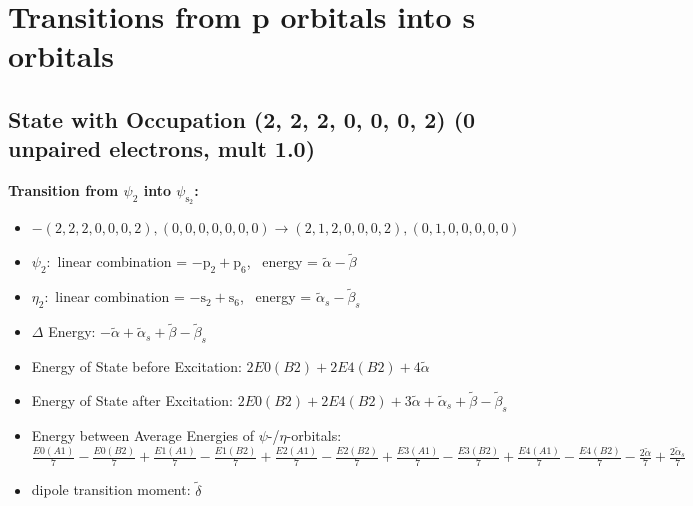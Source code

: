 \documentclass[12pt,a4paper]{article}
\begin{document}
\newpage \section*{Transitions from p orbitals into s orbitals}\subsection*{State with Occupation (2, 2, 2, 0, 0, 0, 2) (0 unpaired electrons, mult 1.0)}
        \noindent\textbf{Transition from $\psi_{2}$ into $\psi_{\text{s}_{2}}$:}
        \begin{itemize}
            \item $- (2, 2, 2, 0, 0, 0, 2), (0, 0, 0, 0, 0, 0, 0) \rightarrow (2, 1, 2, 0, 0, 0, 2), (0, 1, 0, 0, 0, 0, 0)$
        
            \item $\psi_{2}:$ linear combination = $- \text{p}_{2} + \text{p}_{6}$, \
            energy = $\tilde{\alpha} - \tilde{\beta}$
            
            \item $\eta_{2}:$ linear combination = $- \text{s}_{2} + \text{s}_{6}$, \
            energy = $\tilde{\alpha}_{s} - \tilde{\beta}_{s}$
            
                \item $\Delta$ Energy: $- \tilde{\alpha} + \tilde{\alpha}_{s} + \tilde{\beta} - \tilde{\beta}_{s}$
                \item Energy of State before Excitation: $2 E0(B2) + 2 E4(B2) + 4 \tilde{\alpha}$
                \item Energy of State after Excitation: $2 E0(B2) + 2 E4(B2) + 3 \tilde{\alpha} + \tilde{\alpha}_{s} + \tilde{\beta} - \tilde{\beta}_{s}$
                \item Energy between Average Energies of $\psi$-/$\eta$-orbitals: $\frac{E0(A1)}{7} - \frac{E0(B2)}{7} + \frac{E1(A1)}{7} - \frac{E1(B2)}{7} + \frac{E2(A1)}{7} - \frac{E2(B2)}{7} + \frac{E3(A1)}{7} - \frac{E3(B2)}{7} + \frac{E4(A1)}{7} - \frac{E4(B2)}{7} - \frac{2 \tilde{\alpha}}{7} + \frac{2 \tilde{\alpha}_{s}}{7}$
            
            \item dipole transition moment: $\tilde{\delta}$
        
        \end{itemize}
        
\end{document}

